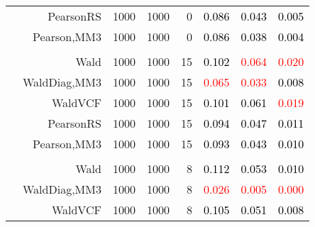 \documentclass[
]{article}
\begin{document}
\begin{table}[H]
{\begin{tabular}[t]{lrrrrrrr}
\hspace{1em} & PearsonRS & 1000 & 1000 & 0 & \textcolor{black}{0.086} & \textcolor{black}{0.043} & \textcolor{black}{0.005}\\

\hspace{1em} & Pearson,MM3 & 1000 & 1000 & 0 & \textcolor{black}{0.086} & \textcolor{black}{0.038} & \textcolor{black}{0.004}\\
\cmidrule{1-8}
\addlinespace[0.3em]
\multicolumn{8}{l}{\textbf{1F 15V}}\\
\hspace{1em} & Wald & 1000 & 1000 & 15 & \textcolor{black}{0.102} & \textcolor{red}{0.064} & \textcolor{red}{0.020}\\

\hspace{1em} & WaldDiag,MM3 & 1000 & 1000 & 15 & \textcolor{red}{0.065} & \textcolor{red}{0.033} & \textcolor{black}{0.008}\\

\hspace{1em} & WaldVCF & 1000 & 1000 & 15 & \textcolor{black}{0.101} & \textcolor{black}{0.061} & \textcolor{red}{0.019}\\

\hspace{1em} & PearsonRS & 1000 & 1000 & 15 & \textcolor{black}{0.094} & \textcolor{black}{0.047} & \textcolor{black}{0.011}\\

\hspace{1em} & Pearson,MM3 & 1000 & 1000 & 15 & \textcolor{black}{0.093} & \textcolor{black}{0.043} & \textcolor{black}{0.010}\\
\cmidrule{1-8}
\addlinespace[0.3em]
\multicolumn{8}{l}{\textbf{2F 10V}}\\
\hspace{1em} & Wald & 1000 & 1000 & 8 & \textcolor{black}{0.112} & \textcolor{black}{0.053} & \textcolor{black}{0.010}\\

\hspace{1em} & WaldDiag,MM3 & 1000 & 1000 & 8 & \textcolor{red}{0.026} & \textcolor{red}{0.005} & \textcolor{red}{0.000}\\

\hspace{1em} & WaldVCF & 1000 & 1000 & 8 & \textcolor{black}{0.105} & \textcolor{black}{0.051} & \textcolor{black}{0.008}\\


\end{tabular}}
\end{table}
\end{document}
